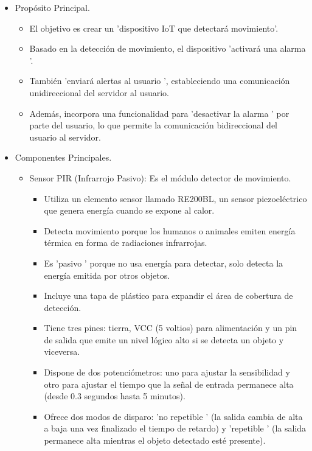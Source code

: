 \documentclass{report}
\begin{document}
\begin{itemize}
\item Propósito Principal.
    \begin{itemize}
        \item El objetivo es crear un 'dispositivo IoT que detectará movimiento'.
        \item Basado en la detección de movimiento, el dispositivo  'activará una alarma '.
        \item También  'enviará alertas al usuario ', estableciendo una comunicación unidireccional del servidor al usuario.
        \item Además, incorpora una funcionalidad para  'desactivar la alarma ' por parte del usuario, lo que permite la comunicación bidireccional del 
        usuario al servidor.
    \end{itemize}
\item Componentes Principales.
    \begin{itemize}
        \item Sensor PIR (Infrarrojo Pasivo): Es el módulo detector de movimiento.
        \begin{itemize}
            \item Utiliza un elemento sensor llamado RE200BL, un sensor piezoeléctrico que genera energía cuando se expone al calor.
            \item Detecta movimiento porque los humanos o animales emiten energía térmica en forma de radiaciones infrarrojas.
            \item Es  'pasivo ' porque no usa energía para detectar, solo detecta la energía emitida por otros objetos.
            \item Incluye una tapa de plástico para expandir el área de cobertura de detección.
            \item Tiene tres pines: tierra, VCC (5 voltios) para alimentación y un pin de salida que emite un nivel lógico alto si se detecta un objeto 
            y viceversa.
            \item Dispone de dos potenciómetros: uno para ajustar la sensibilidad y otro para ajustar el tiempo que la señal de entrada permanece alta 
            (desde 0.3 segundos hasta 5 minutos).
            \item Ofrece  dos modos de disparo:  'no repetible ' (la salida cambia de alta a baja una vez finalizado el tiempo de retardo) y  'repetible ' 
            (la salida permanece alta mientras el objeto detectado esté presente).
        \end{itemize}

\end{itemize}
\end{itemize}
\end{document}
